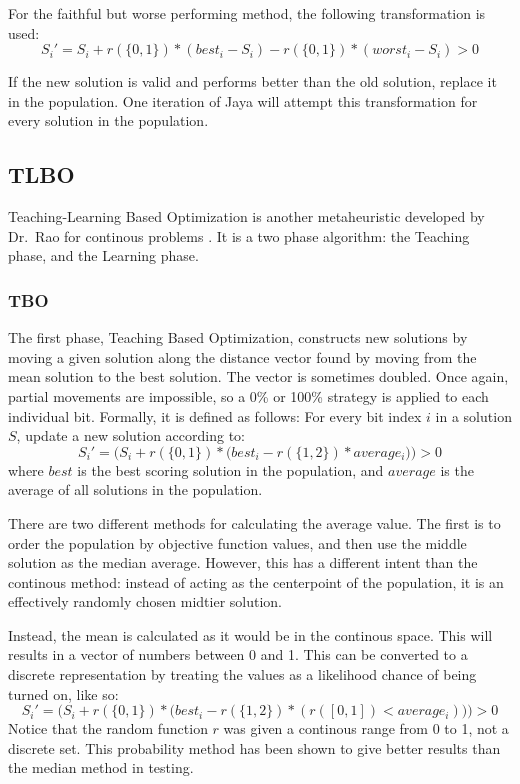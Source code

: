 \documentclass[11pt, letterpaper, onecolumn]{article}
\begin{document}
For the faithful but worse performing method, the following transformation is used: 
\begin{equation} S_i' = S_i + r(\{0, 1\})*(best_i - S_i) - r(\{0, 1\})*(worst_i - S_i) > 0 \end{equation}


If the new solution is valid and performs better than the old solution, replace it in the population. One iteration of Jaya will attempt this transformation for every solution in the population. 


\subsection{TLBO}

Teaching-Learning Based Optimization is another metaheuristic developed by Dr.~Rao for continous problems %
. It is a two phase algorithm: the Teaching phase, and the Learning phase.

\subsubsection{TBO}

The first phase, Teaching Based Optimization, constructs new solutions by moving a given solution along the distance vector found by moving from the mean solution to the best solution. The vector is sometimes doubled. Once again, partial movements are impossible, so a 0\% or 100\% strategy is applied to each individual bit. Formally, it is defined as follows: For every bit index $i$ in a solution $S$, update a new solution according to: 
\begin{equation}
S_i' = \Big(S_i + r(\{0, 1\})*\big(best_i - r(\{1, 2\})*average_i\big)\Big) > 0
\end{equation}
where $best$ is the best scoring solution in the population, and $average$ is the average of all solutions in the population. 

There are two different methods for calculating the average value. The first is to order the population by objective function values, and then use the middle solution as the median average. However, this has a different intent than the continous method: instead of acting as the centerpoint of the population, it is an effectively randomly chosen midtier solution. 

Instead, the mean is calculated as it would be in the continous space. This will results in a vector of numbers between 0 and 1. This can be converted to a discrete representation by treating the values as a likelihood chance of being turned on, like so: 
\begin{equation}
S_i' = \Big(S_i + r(\{0, 1\})*\big(best_i - r(\{1, 2\})*(r([0, 1]) < average_i)\big)\Big) > 0
\end{equation}
Notice that the random function $r$ was given a continous range from 0 to 1, not a discrete set. This probability method has been shown to give better results than the median method in testing. 
\end{document}
